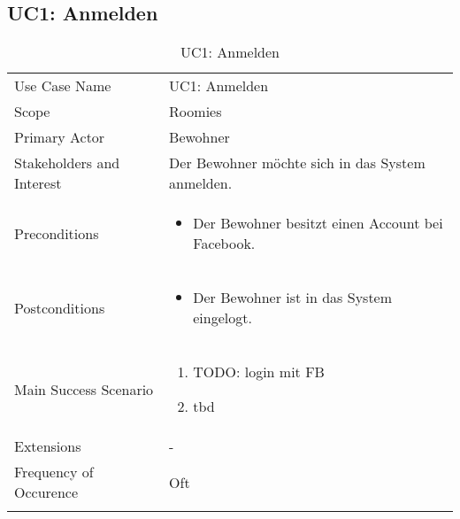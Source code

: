 \subsection{UC1: Anmelden}
\begin{table}[H]
	\tablestyle
	\tablealtcolored
	\begin{tabularx}{\textwidth}{lX}
		\tablebody
			Use Case Name &
			UC1: Anmelden
			\tabularnewline
			Scope &
			Roomies
			\tabularnewline
			Primary Actor &
			Bewohner
			\tabularnewline
			Stakeholders and Interest &
			Der Bewohner möchte sich in das System anmelden.
			\tabularnewline
			Preconditions &
			\begin{itemize}
				\item Der Bewohner besitzt einen Account bei Facebook.
			\end{itemize}
			\tabularnewline
			Postconditions &
			\begin{itemize}
				\item Der Bewohner ist in das System eingelogt.
			\end{itemize}
			\tabularnewline
			Main Success Scenario &
			\begin{enumerate}
				\item TODO: login mit FB
				\item tbd
			\end{enumerate}
			\tabularnewline
			Extensions &
			-
			\tabularnewline
			Frequency of Occurence &
			Oft
			\tabularnewline
		\tableend
	\end{tabularx}
	\caption{UC1: Anmelden}
\end{table}


